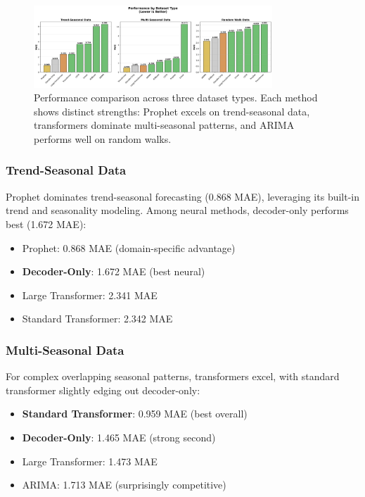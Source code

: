 \documentclass[11pt]{article}
\begin{document}
\begin{figure}[h]
\centering
\includegraphics[width=0.8\textwidth]{../results/figure3_dataset_performance.png}
\caption{Performance comparison across three dataset types. Each method shows distinct strengths: Prophet excels on trend-seasonal data, transformers dominate multi-seasonal patterns, and ARIMA performs well on random walks.}
\label{fig:dataset_performance}
\end{figure}

\subsubsection{Trend-Seasonal Data}

Prophet dominates trend-seasonal forecasting (0.868 MAE), leveraging its built-in trend and seasonality modeling. Among neural methods, decoder-only performs best (1.672 MAE):

\begin{itemize}
\item Prophet: 0.868 MAE (domain-specific advantage)
\item \textbf{Decoder-Only}: 1.672 MAE (best neural)
\item Large Transformer: 2.341 MAE
\item Standard Transformer: 2.342 MAE
\end{itemize}

\subsubsection{Multi-Seasonal Data}

For complex overlapping seasonal patterns, transformers excel, with standard transformer slightly edging out decoder-only:

\begin{itemize}
\item \textbf{Standard Transformer}: 0.959 MAE (best overall)
\item \textbf{Decoder-Only}: 1.465 MAE (strong second)
\item Large Transformer: 1.473 MAE
\item ARIMA: 1.713 MAE (surprisingly competitive)
\end{itemize}
\end{document}
